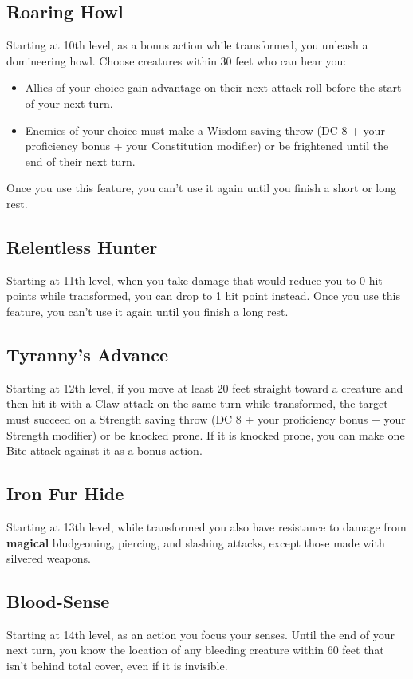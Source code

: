 \documentclass[letterpaper,twocolumn,openany,nodeprecatedcode,breakable,skins,xparse,most]{dndbook}
\begin{document}
\subsection*{Roaring Howl}
Starting at 10th level, as a bonus action while transformed, you unleash a domineering howl. Choose creatures within 30 feet who can hear you:
\begin{itemize}
\item Allies of your choice gain advantage on their next attack roll before the start of your next turn.
\item Enemies of your choice must make a Wisdom saving throw (DC 8 + your proficiency bonus + your Constitution modifier) or be frightened until the end of their next turn.
\end{itemize}
Once you use this feature, you can't use it again until you finish a short or long rest.

\subsection*{Relentless Hunter}
Starting at 11th level, when you take damage that would reduce you to 0 hit points while transformed, you can drop to 1 hit point instead. Once you use this feature, you can't use it again until you finish a long rest.

\subsection*{Tyranny's Advance}
Starting at 12th level, if you move at least 20 feet straight toward a creature and then hit it with a Claw attack on the same turn while transformed, the target must succeed on a Strength saving throw (DC 8 + your proficiency bonus + your Strength modifier) or be knocked prone. If it is knocked prone, you can make one Bite attack against it as a bonus action.

\subsection*{Iron Fur Hide}
Starting at 13th level, while transformed you also have resistance to damage from \textbf{magical} bludgeoning, piercing, and slashing attacks, except those made with silvered weapons.

\subsection*{Blood-Sense}
Starting at 14th level, as an action you focus your senses. Until the end of your next turn, you know the location of any bleeding creature within 60 feet that isn't behind total cover, even if it is invisible.
\end{document}
